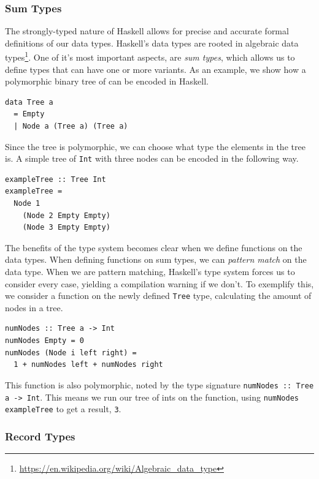 \documentclass[a4paper,english]{ifimaster}
\begin{document}
\subsubsection{Sum Types}%
\label{ssub:a_powerful_type_system}

The strongly-typed nature of Haskell allows for precise and accurate formal definitions of our data types. Haskell's data types are rooted in algebraic data types\footnote{\url{https://en.wikipedia.org/wiki/Algebraic_data_type}}. One of it's most important aspects, are \textit{sum types}, which allows us to define types that can have one or more variants. As an example, we show how a polymorphic binary tree of can be encoded in Haskell.

\begin{verbatim}
data Tree a
  = Empty
  | Node a (Tree a) (Tree a)
\end{verbatim}

Since the tree is polymorphic, we can choose what type the elements in the tree is. A simple tree of \texttt{Int} with three nodes can be encoded in the following way.

\begin{verbatim}
exampleTree :: Tree Int
exampleTree =
  Node 1
    (Node 2 Empty Empty)
    (Node 3 Empty Empty)
\end{verbatim}

The benefits of the type system becomes clear when we define functions on the data types. When defining functions on sum types, we can \textit{pattern match} on the data type. When we are pattern matching, Haskell's type system forces us to consider every case, yielding a compilation warning if we don't. To exemplify this, we consider a function on the newly defined \texttt{Tree} type, calculating the amount of nodes in a tree.

\begin{verbatim}
numNodes :: Tree a -> Int
numNodes Empty = 0
numNodes (Node i left right) = 
  1 + numNodes left + numNodes right
\end{verbatim}

This function is also polymorphic, noted by the type signature \texttt{numNodes :: Tree a -> Int}. This means we run our tree of ints on the function, using \texttt{numNodes exampleTree} to get a result, \texttt{3}.

\subsubsection{Record Types}%
\label{ssub:record_types}
\end{document}
